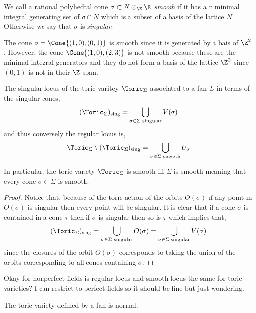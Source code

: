 \begin{defn}
We call a rational polyhedral cone $\sigma \subset N \otimes_\Z \R$ \textit{smooth} if it has a n minimal integral generating set of $\sigma \cap N$ which is a subset of a basis of the lattice $N$. Otherwise we say that $\sigma$ is \textit{singular}.
\end{defn}


\begin{example}
The cone $\sigma = \Cone{(1, 0), (0, 1)}$ is smooth since it is generated by a bais of $\Z^2$. However, the cone $\Cone{(1, 0), (2, 3)}$ is not smooth because these are the minimal integral generators and they do not form a basis of the lattice $\Z^2$ since $(0, 1)$ is not in their $\Z$-span.
\end{example}

\begin{lemma}
The singular locus of the toric varitey $\Toric_\Sigma$ associated to a fan $\Sigma$ in terms of the singular cones,
\[ (\Toric_\Sigma)_{\text{sing}} = \bigcup_{\sigma \in \Sigma \text{ singular}} V(\sigma) \]
and thus conversely the regular locus is,
\[ \Toric_{\Sigma} \setminus (\Toric_\Sigma)_{\text{sing}} = \bigcup_{\sigma \in \Sigma \text{ smooth}} U_\sigma \] 
\end{lemma}
\noindent
In particular, the toric variety $\Toric_\Sigma$ is smooth iff $\Sigma$ is smooth meaning that every cone $\sigma \in \Sigma$ is smooth. 

\begin{proof}
Notice that, because of the toric action of the orbits $O(\sigma)$ if any point in $O(\sigma)$ is singular then every point will be singular. It is clear that if a cone $\sigma$ is contained in a cone $\tau$ then if $\sigma$ is singular then so is $\tau$ which implies that,
\[ (\Toric_\Sigma)_{\text{sing}} = \bigcup_{\sigma \in \Sigma \text{ singular}} O(\sigma) = \bigcup_{\sigma \in \Sigma \text{ singular}} V(\sigma) \]
since the closures of the orbit $O(\sigma)$ corresponds to taking the union of the orbits corresponding to all cones containing $\sigma$. 
\end{proof}

\begin{question}
Okay for nonperfect fields is regular locus and smooth locus the same for toric varieties? I can restrict to perfect fields so it should be fine but just wondering.
\end{question}

\begin{prop}
The toric variety defined by a fan is normal. 
\end{prop}

